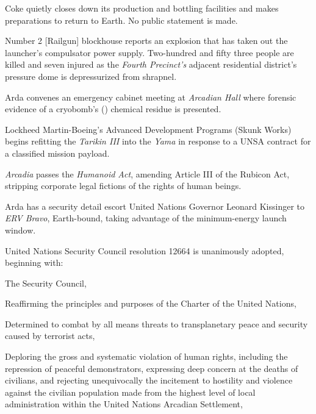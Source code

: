 \StopTimelineDate

Coke quietly closes down its production and bottling facilities and makes preparations to return to Earth. No public statement is made.
\StopTimelineDate

Number 2 [Railgun] blockhouse reports an explosion that has taken out the launcher's compulsator power supply. Two-hundred and fifty three people are killed and seven injured as the {\it Fourth Precinct's} adjacent residential district's pressure dome is depressurized from shrapnel.

Arda convenes an emergency cabinet meeting at {\it Arcadian Hall} where forensic evidence of a cryobomb's () chemical residue is presented.
\StopTimelineDate

Lockheed Martin-Boeing's Advanced Development Programs (Skunk Works) begins refitting the {\it Tarikin III} into the {\it Yama} in response to a UNSA contract for a classified mission payload.
\StopTimelineDate

{\it Arcadia} passes the {\it Humanoid Act}, amending Article III of the Rubicon Act, stripping corporate legal fictions of the rights of human beings.
\StopTimelineDate

Arda has a security detail escort United Nations Governor Leonard Kissinger to {\it ERV Bravo}, Earth-bound, taking advantage of the minimum-energy launch window.
\StopTimelineDate

United Nations Security Council resolution 12664 is unanimously adopted, beginning with:

\startTimelineDocument
The Security Council,

Reaffirming the principles and purposes of the Charter of the United Nations,

Determined to combat by all means threats to transplanetary peace and security caused by terrorist acts,

Deploring the gross and systematic violation of human rights, including the repression of peaceful demonstrators, expressing deep concern at the deaths of civilians, and rejecting unequivocally the incitement to hostility and violence against the civilian population made from the highest level of local administration within the United Nations Arcadian Settlement,

